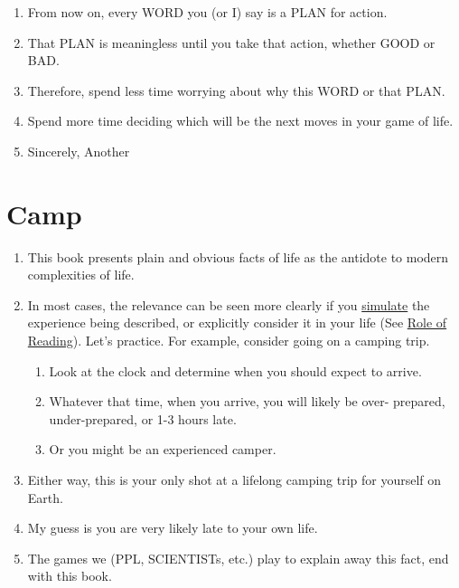 \documentclass[
]{book}
\providecommand{\tightlist}{%
  \setlength{\itemsep}{0pt}\setlength{\parskip}{0pt}}
\begin{document}
\begin{enumerate}
\def\labelenumi{\arabic{enumi}.}
\setcounter{enumi}{8}
\item
  From now on, every WORD you (or I) say is a PLAN for action.
\item
  That PLAN is meaningless until you take that action, whether GOOD or BAD.
\item
  Therefore, spend less time worrying about why this WORD or that PLAN.
\item
  Spend more time deciding which will be the next moves in your game of life.
\item
  Sincerely, Another
\end{enumerate}

\hypertarget{camp}{%
\section{Camp}\label{camp}}

\begin{enumerate}
\def\labelenumi{\arabic{enumi}.}
\setcounter{enumi}{12}
\tightlist
\item
  This book presents plain and obvious facts of life as the antidote to modern complexities of life.
\item
  In most cases, the relevance can be seen more clearly if you \protect\hyperlink{words}{simulate} the experience being described, or explicitly consider it in your life (See \protect\hyperlink{read}{Role of Reading}). Let's practice. For example, consider going on a camping trip.

  \begin{enumerate}
  \def\labelenumii{\arabic{enumii}.}
  \tightlist
  \item
    Look at the clock and determine when you should expect to arrive.
  \item
    Whatever that time, when you arrive, you will likely be over- prepared, under-prepared, or 1-3 hours late.
  \item
    Or you might be an experienced camper.
  \end{enumerate}
\item
  Either way, this is your only shot at a lifelong camping trip for yourself on Earth.
\item
  My guess is you are very likely late to your own life.
\item
  The games we (PPL, SCIENTISTs, etc.) play to explain away this fact, end with this book.
\end{enumerate}
\end{document}
